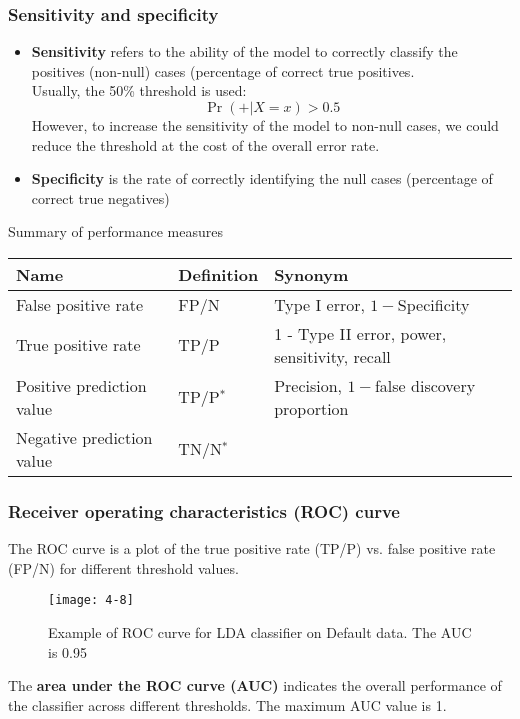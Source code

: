 \documentclass[smaller]{beamer}
\newcommand{\?}{\stackrel{?}{=}}
\begin{document}
\begin{frame}
  \frametitle{Sensitivity and specificity}
  \pause
  \begin{itemize}[<+->]
  \item \textbf{Sensitivity} refers to the ability of the model to correctly classify the positives (non-null) cases (percentage of correct true positives.\\\pause
    Usually, the 50\% threshold is used:\pause
    \begin{equation}
      \Pr(+|X=x) > 0.5
    \end{equation}\pause
    However, to increase the sensitivity of the model to non-null cases, we could reduce the threshold at the cost of the overall error rate.
  \item \textbf{Specificity} is the rate of correctly identifying the null cases (percentage of correct true negatives)
  \end{itemize}
  \pause
  \begin{block}{Summary of performance measures}
    \pause\small
    \begin{tabular}{l l l}
      \bf Name & \bf Definition & \bf Synonym \\\midrule
      False positive rate & FP/N & Type I error, $1-$Specificity \\
      True positive rate & TP/P & 1 - Type II error, power, sensitivity, recall\\
      Positive prediction value & TP/P$^*$ & Precision, $1-$false discovery proportion\\
      Negative prediction value & TN/N$^*$ & \\\bottomrule
    \end{tabular}
  \end{block}
\end{frame}

\begin{frame}
  \frametitle{Receiver operating characteristics (ROC) curve}
  The ROC curve is a plot of the true positive rate (TP/P) vs. false positive rate (FP/N) for different threshold values.\pause
  \begin{figure}[h!]
    \centering
    \texttt{[image: 4-8]}
    \caption{Example of ROC curve for LDA classifier on Default data. The AUC is 0.95}
  \end{figure}
  \pause
  The \textbf{area under the ROC curve (AUC)} indicates the overall performance of the classifier across different thresholds.\pause
  The maximum AUC value is 1.
\end{frame}
\end{document}
